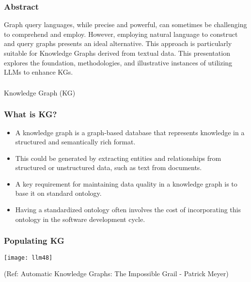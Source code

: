 \begin{frame}[fragile]\frametitle{Abstract}

Graph query languages, while precise and powerful, can sometimes be challenging to comprehend and employ. 
However, employing natural language to construct and query graphs presents an ideal alternative. 
This approach is particularly suitable for Knowledge Graphs derived from textual data. 
This presentation explores the foundation, methodologies, and illustrative instances of utilizing LLMs to enhance KGs.


\end{frame}

\begin{frame}[fragile]\frametitle{}
\begin{center}
{\Large Knowledge Graph (KG)}

\end{center}
\end{frame}

\begin{frame}[fragile]\frametitle{What is KG?}

\begin{itemize}
\item A knowledge graph is a graph-based database that represents knowledge in a structured and semantically rich format. 
\item This could be generated by extracting entities and relationships from structured or unstructured data, such as text from documents. 
\item A key requirement for maintaining data quality in a knowledge graph is to base it on standard ontology. 
\item Having a standardized ontology often involves the cost of incorporating this ontology in the software development cycle.
\end{itemize}

\end{frame}

\begin{frame}[fragile]\frametitle{Populating KG}

\begin{center}
\texttt{[image: llm48]}
\end{center}

{\tiny (Ref: Automatic Knowledge Graphs: The Impossible Grail - Patrick Meyer)}

\end{frame}


